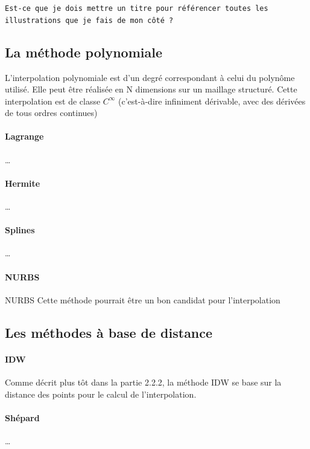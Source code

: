 \texttt{Est-ce que je dois mettre un titre pour référencer toutes les illustrations que je fais de mon côté ?}





\subsection{La méthode polynomiale}

L'interpolation polynomiale est d'un degré correspondant à celui du polynôme utilisé. Elle peut être réalisée en N dimensions sur un maillage structuré. Cette interpolation est de classe \(C^\infty\) (c'est-à-dire infiniment dérivable, avec des dérivées de tous ordres continues)

\paragraph{Lagrange}
\vspace{0.5cm}
\dots
\paragraph{Hermite}
\vspace{0.5cm}
\dots
\paragraph{Splines}
\vspace{0.5cm}
\dots
\paragraph{NURBS}
\vspace{0.5cm}
\ac{NURBS}
Cette méthode\cite{piegl1995nurbs} pourrait être un bon candidat pour l'interpolation


\subsection{Les méthodes à base de distance}
\paragraph{IDW}
\vspace{0.5cm}
Comme décrit plus tôt dans la partie 2.2.2, la méthode IDW se base sur la distance des points pour le calcul de l'interpolation.
\paragraph{Shépard}
\vspace{0.5cm}
\dots
